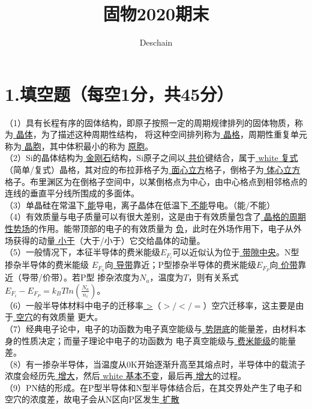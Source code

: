 \documentclass[UTF8]{ctexart}
\title{固物2020期末}
\author{Deschain}
\begin{document}
\maketitle
\section*{1.填空题（每空1分，共45分）}
（1）具有长程有序的固体结构，即原子按照一定的周期规律排列的固体物质，称为\uline{{\color{white} 晶体}}，为了描述这种周期性结构，
将这种空间排列称为\uline{{\color{white} 晶格}}，周期性重复单元称为\uline{{\color{white} 晶胞}}，其中体积最小的称为
\uline{{\color{white} 原胞}}。\\
（2）Si的晶体结构为\uline{{\color{white} 金刚石}}结构，Si原子之间以\uline{{\color{white} 共价}}键结合，属于\uline{{\color
{white} 复式}}（简单/复式）晶格，其对应的布拉菲格子为\uline{{\color{white} 面心立方}}格子，倒格子为\uline{{\color{white} 体心立方}}
格子。布里渊区为在倒格子空间中，以某倒格点为中心，由中心格点到相邻格点的连线的垂直平分线所围成的多面体。\\
（3）单晶硅在常温下\uline{{\color{white} 能}}导电，离子晶体在低温下\uline{{\color{white} 不能}}导电。（能/不能）\\
（4）有效质量与电子质量可以有很大差别，这是由于有效质量包含了\uline{{\color{white} 晶格的周期性势场}}的作用。能带顶部的电子的有效质量为
\uline{{\color{white} 负}}，此时在外场作用下，电子从外场获得的动量\uline{{\color{white} 小于}}（大于/小于）它交给晶体的动量。\\
（5）一般情况下，本征半导体的费米能级$E_{F_i}$可以近似认为位于\uline{{\color{white} 带隙中央}}。N型掺杂半导体的费米能级
$E_{F_n}$向\uline{{\color{white} 导带}}靠近；P型掺杂半导体的费米能级$E_{F_P}$向\uline{{\color{white} 价带}}靠近（导带/价带）。若P型
掺杂浓度为$N_a$，温度为$T$，则有关系式$E_{F_i}-E_{F_P}=k_BTln(\frac{N_a}{n_i})$。\\
（6）一般半导体材料中电子的迁移率\uline{{\color{white} >}}（$>/</=$）空穴迁移率，这主要是由于\uline{{\color{white} 空穴}}的有效质量
更大。\\
（7）经典电子论中，电子的功函数为电子真空能级与\uline{{\color{white} 势阱底}}的能量差，由材料本身的性质决定；而量子理论中电子的功函数为
电子真空能级与\uline{{\color{white} 费米能级}}的能量差。\\
（8）有一掺杂半导体，当温度从0K开始逐渐升高至其熔点时，半导体中的载流子浓度会经历先\uline{{\color{white} 增大}}，然后\uline{{\color
{white} 基本不变}}，最后再\uline{{\color{white} 增大}}的过程。\\
（9）PN结的形成。在P型半导体和N型半导体结合后，在其交界处产生了电子和空穴的浓度差，故电子会从N区向P区发生\uline{{\color{white} 扩散}}
\end{document}
